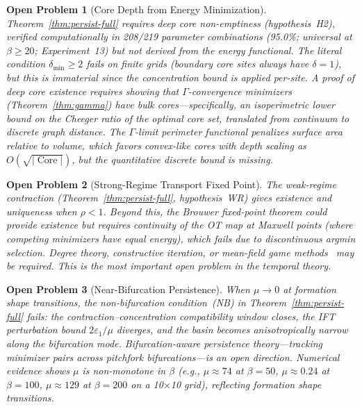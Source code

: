 \documentclass[lettersize,journal]{IEEEtran}
\newtheorem{openproblem}{Open Problem}
\DeclareMathOperator{\Core}{Core}
\begin{document}
\begin{openproblem}[Core Depth from Energy Minimization]
\label{op:core-depth}
Theorem~\ref{thm:persist-full} requires deep core non-emptiness (hypothesis~H2), verified computationally in 208/219 parameter combinations (95.0\%; universal at $\beta \geq 20$; Experiment~13) but not derived from the energy functional. The literal condition $\delta_{\min} \geq 2$ fails on finite grids (boundary core sites always have $\delta = 1$), but this is immaterial since the concentration bound is applied per-site. A proof of deep core existence requires showing that $\Gamma$-convergence minimizers (Theorem~\ref{thm:gamma}) have bulk cores---specifically, an isoperimetric lower bound on the Cheeger ratio of the optimal core set, translated from continuum to discrete graph distance. The $\Gamma$-limit perimeter functional penalizes surface area relative to volume, which favors convex-like cores with depth scaling as $O(\sqrt{|\Core|})$, but the quantitative discrete bound is missing.
\end{openproblem}

\begin{openproblem}[Strong-Regime Transport Fixed Point]
The weak-regime contraction (Theorem~\ref{thm:persist-full}, hypothesis~WR) gives existence and uniqueness when $\rho < 1$. Beyond this, the Brouwer fixed-point theorem could provide existence but requires continuity of the OT map at Maxwell points (where competing minimizers have equal energy), which fails due to discontinuous argmin selection. Degree theory, constructive iteration, or mean-field game methods~\cite{LasryLions2007} may be required. This is the most important open problem in the temporal theory.
\end{openproblem}

\begin{openproblem}[Near-Bifurcation Persistence]
When $\mu \to 0$ at formation shape transitions, the non-bifurcation condition~(NB) in Theorem~\ref{thm:persist-full} fails: the contraction--concentration compatibility window closes, the IFT perturbation bound $2\varepsilon_1/\mu$ diverges, and the basin becomes anisotropically narrow along the bifurcation mode. Bifurcation-aware persistence theory---tracking minimizer pairs across pitchfork bifurcations---is an open direction. Numerical evidence shows $\mu$ is non-monotone in $\beta$ (e.g., $\mu \approx 74$ at $\beta = 50$, $\mu \approx 0.24$ at $\beta = 100$, $\mu \approx 129$ at $\beta = 200$ on a 10$\times$10 grid), reflecting formation shape transitions.
\end{openproblem}
\end{document}
